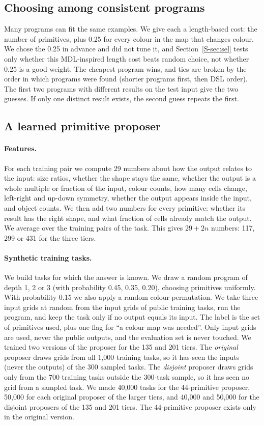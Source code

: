 \documentclass[sigconf,nonacm]{acmart}
\begin{document}
\subsection{Choosing among consistent programs}

Many programs can fit the same examples. We give each a length-based cost: the number of primitives, plus 0.25 for every colour in the map that changes colour. We chose the 0.25 in advance and did not tune it, and Section~\ref{S-sec:sel} tests only whether this MDL-inspired length cost beats random choice, not whether 0.25 is a good weight. The cheapest program wins, and ties are broken by the order in which programs were found (shorter programs first, then DSL order). The first two programs with different results on the test input give the two guesses. If only one distinct result exists, the second guess repeats the first.

\subsection{A learned primitive proposer}

\paragraph{Features.} For each training pair we compute 29 numbers about how the output relates to the input: size ratios, whether the shape stays the same, whether the output is a whole multiple or fraction of the input, colour counts, how many cells change, left-right and up-down symmetry, whether the output appears inside the input, and object counts. We then add two numbers for every primitive: whether its result has the right shape, and what fraction of cells already match the output. We average over the training pairs of the task. This gives $29+2n$ numbers: 117, 299 or 431 for the three tiers.

\paragraph{Synthetic training tasks.} We build tasks for which the answer is known. We draw a random program of depth 1, 2 or 3 (with probability 0.45, 0.35, 0.20), choosing primitives uniformly. With probability 0.15 we also apply a random colour permutation. We take three input grids at random from the input grids of public training tasks, run the program, and keep the task only if no output equals its input. The label is the set of primitives used, plus one flag for ``a colour map was needed''. Only input grids are used, never the public outputs, and the evaluation set is never touched. We trained two versions of the proposer for the 135 and 201 tiers. The \emph{original} proposer draws grids from all 1{,}000 training tasks, so it has seen the inputs (never the outputs) of the 300 sampled tasks. The \emph{disjoint} proposer draws grids only from the 700 training tasks outside the 300-task sample, so it has seen no grid from a sampled task. We made 40{,}000 tasks for the 44-primitive proposer, 50{,}000 for each original proposer of the larger tiers, and 40{,}000 and 50{,}000 for the disjoint proposers of the 135 and 201 tiers. The 44-primitive proposer exists only in the original version.
\end{document}
